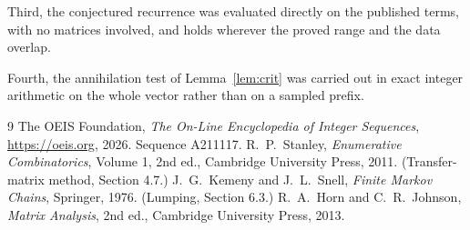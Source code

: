 \documentclass[11pt,a4paper]{article}
\theoremstyle{plain}
\theoremstyle{definition}
\begin{document}
Third, the conjectured recurrence was evaluated directly on the published terms, with no
matrices involved, and holds wherever the proved range and the data overlap.

Fourth, the annihilation test of Lemma~\ref{lem:crit} was carried out in exact integer
arithmetic on the whole vector rather than on a sampled prefix.

\begin{thebibliography}{9}
 The OEIS Foundation, \emph{The On-Line Encyclopedia of Integer
Sequences}, \url{https://oeis.org}, 2026. Sequence A211117.
 R.~P.~Stanley, \emph{Enumerative Combinatorics}, Volume 1, 2nd ed.,
Cambridge University Press, 2011. (Transfer-matrix method, Section 4.7.)
 J.~G.~Kemeny and J.~L.~Snell, \emph{Finite Markov Chains}, Springer, 1976.
(Lumping, Section 6.3.)
 R.~A.~Horn and C.~R.~Johnson, \emph{Matrix Analysis}, 2nd ed., Cambridge
University Press, 2013.
\end{thebibliography}
\end{document}
